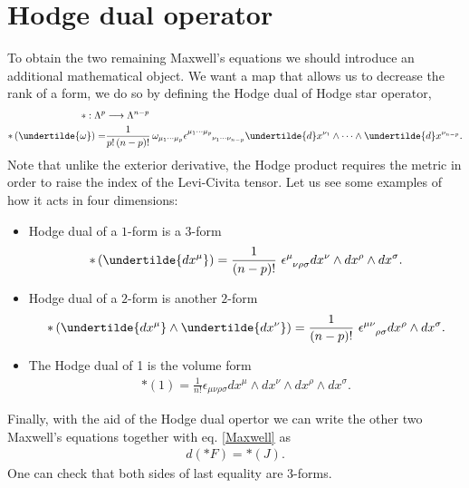 \documentclass[10pt]{article}
\begin{document}
	\section{Hodge dual operator}
	To obtain the two remaining Maxwell's equations we should introduce an additional mathematical object. We want a map that allows us to decrease the rank of a form, we do so by defining the Hodge dual of Hodge star operator,
	\begin{align*}
	\ast: \Lambda^p &\longrightarrow \Lambda^{n-p}\\
	\ast\,(\undertilde{\omega})=&\frac{1}{p!\, (n-p)!}\,\omega_{\mu_1\cdots \mu_p}\tensor{\epsilon}{^{\mu_1\cdots \mu_p}_{\nu_1\cdots \nu_{n-p}}}\undertilde{d}x^{\nu_1}\wedge\cdots\wedge\undertilde{d}x^{\nu_{n-p}}.
	\end{align*} 
	Note that unlike the exterior derivative, the Hodge product requires the metric in order to raise the index of the Levi-Civita tensor. Let us see some examples of how it acts in four dimensions:
	\begin{itemize}
	\item Hodge dual of a $1$-form is a $3$-form
	\begin{align}
	\ast\,(\undertilde{d x^{\mu}})=\frac{1}{(n-p)!}~\tensor{\epsilon}{^{\mu}_{\nu\rho\sigma}}dx^{\nu}\wedge dx^{\rho} \wedge dx^{\sigma}.
	\end{align}
	\item Hodge dual of a $2$-form is another $2$-form
	\begin{align}
	\ast\,(\undertilde{d x^{\mu}}\wedge \undertilde{d x^{\nu}})=\frac{1}{(n-p)!}~\tensor{\epsilon}{^{\mu \nu}_{\rho \sigma}} dx^{\rho} \wedge dx^{\sigma}.
	\end{align}
	\item The Hodge dual of 1 is the volume form
	\begin{align*}
	\ast(1)=\frac{1}{n!}\epsilon_{\mu \nu \rho \sigma} dx^{\mu} \wedge dx^{\nu} \wedge dx^{\rho} \wedge dx^{\sigma}.
	\end{align*}
	\end{itemize}
	Finally, with the aid of  the Hodge dual opertor we can write the other two Maxwell's equations together with eq. \eqref{Maxwell} as
	\begin{align}
	d(\ast F)=\ast(J).
	\end{align}
	One can check that both sides of last equality are $3$-forms.
	               	
\end{document}
